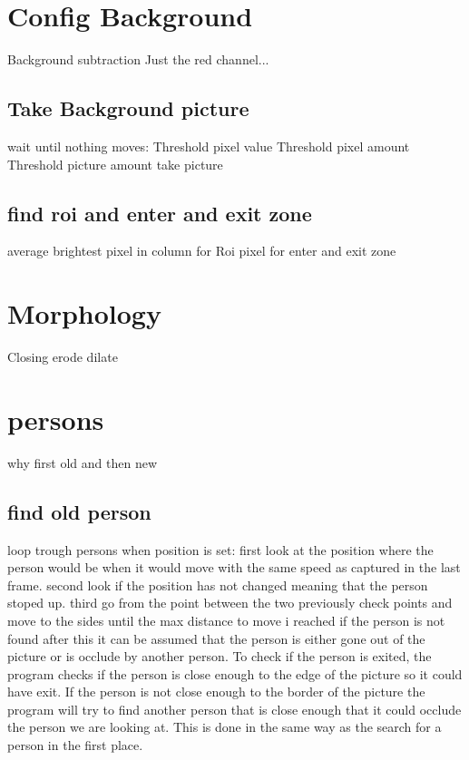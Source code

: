 \section{Config Background}

Background subtraction
Just the red channel...
\subsection{Take Background picture}
wait until nothing moves:
	Threshold pixel value
	Threshold pixel amount
	Threshold picture amount
take picture
\subsection{find roi and enter and exit zone}
average brightest pixel in column for Roi
pixel for enter and exit zone







\section{Morphology}
Closing
	erode
	dilate
	
\section{persons}
why first old and then new
\subsection{find old person}
loop trough persons
when position is set:
	first look at the position where the person would be when it would move with the same speed as captured in the last frame.
	second look if the position has not changed meaning that the person stoped up.
	third go from the point between the two previously check points and move to the sides until the max distance to move i reached
	if the person is not found after this it can be assumed that the person is either gone out of the picture or is occlude by another person. To check if the person is exited, the program checks if the person is close enough to the edge of the picture so it could have exit. If the person is not close enough to the border of the  picture the program will try to find another person that is close enough that it could occlude the person we are looking at.  This is done in the same way as the search for a person in the first place.
	
